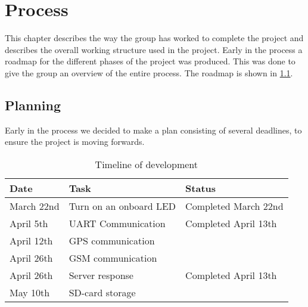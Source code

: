 
\chapter{Process}
This chapter describes the way the group has worked to complete the project and describes the overall working structure used in the project.
Early in the process a roadmap for the different phases of the project was produced. This was done to give the group an overview of the entire process. The roadmap is shown in \cref{tab:timeline}.

\section{Planning}
Early in the process we decided to make a plan consisting of several deadlines, to ensure the project is moving forwards.

\begin{table}[H]
	\begin{tabularx}{\textwidth}{l X X}
		\toprule
		Date & Task & Status \\
		\midrule
		March 22nd & Turn on an onboard LED & Completed March 22nd \\
		April 5th & UART Communication & Completed April 13th\\
		April 12th & GPS communication & \\
		April 26th & GSM communication & \\
		April 26th & Server response & Completed April 13th\\
		May 10th & SD-card storage & \\
		\bottomrule
	\end{tabularx}
	\caption{Timeline of development}
	\label{tab:timeline}
\end{table}